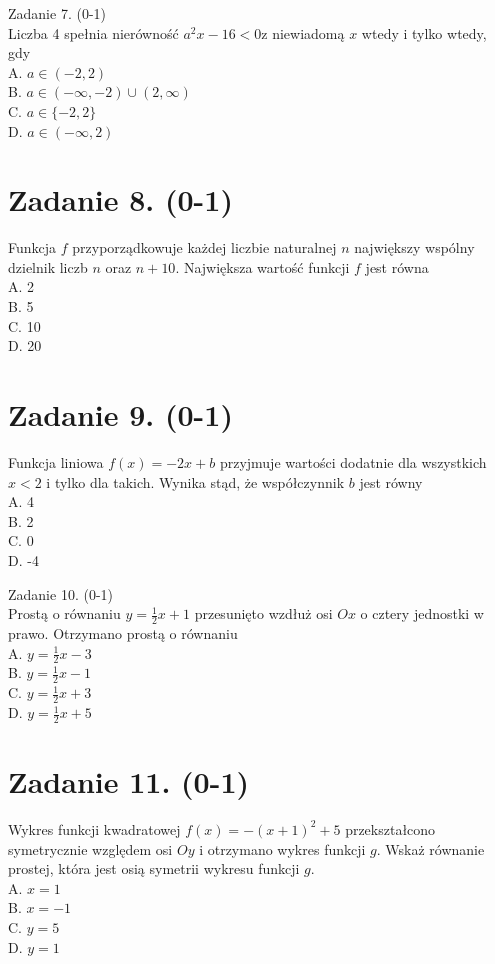 \documentclass[10pt]{article}
\begin{document}
Zadanie 7. (0-1)\\
Liczba 4 spełnia nierówność \(a^{2} x-16<0 \mathrm{z}\) niewiadomą \(x\) wtedy i tylko wtedy, gdy\\
A. \(a \in(-2,2)\)\\
B. \(a \in(-\infty,-2) \cup(2, \infty)\)\\
C. \(a \in\{-2,2\}\)\\
D. \(a \in(-\infty, 2)\)

\section*{Zadanie 8. (0-1)}
Funkcja \(f\) przyporządkowuje każdej liczbie naturalnej \(n\) największy wspólny dzielnik liczb \(n\) oraz \(n+10\). Największa wartość funkcji \(f\) jest równa\\
A. 2\\
B. 5\\
C. 10\\
D. 20

\section*{Zadanie 9. (0-1)}
Funkcja liniowa \(f(x)=-2 x+b\) przyjmuje wartości dodatnie dla wszystkich \(x<2\) i tylko dla takich. Wynika stąd, że współczynnik \(b\) jest równy\\
A. 4\\
B. 2\\
C. 0\\
D. -4

Zadanie 10. (0-1)\\
Prostą o równaniu \(y=\frac{1}{2} x+1\) przesunięto wzdłuż osi \(O x\) o cztery jednostki w prawo. Otrzymano prostą o równaniu\\
A. \(y=\frac{1}{2} x-3\)\\
B. \(y=\frac{1}{2} x-1\)\\
C. \(y=\frac{1}{2} x+3\)\\
D. \(y=\frac{1}{2} x+5\)

\section*{Zadanie 11. (0-1)}
Wykres funkcji kwadratowej \(f(x)=-(x+1)^{2}+5\) przekształcono symetrycznie względem osi \(O y\) i otrzymano wykres funkcji \(g\). Wskaż równanie prostej, która jest osią symetrii wykresu funkcji \(g\).\\
A. \(x=1\)\\
B. \(x=-1\)\\
C. \(y=5\)\\
D. \(y=1\)
\end{document}
